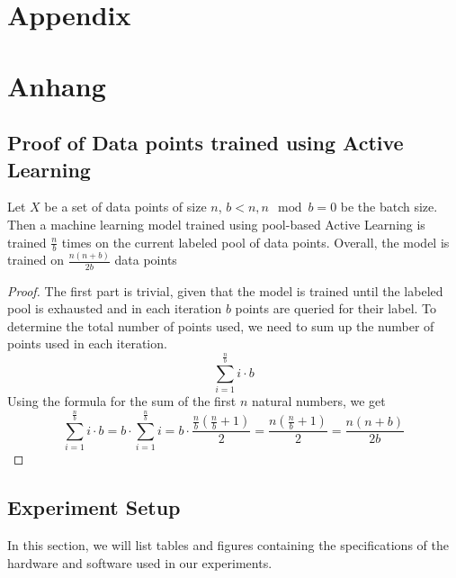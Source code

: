 
{\chapter{Appendix}}    %
{\chapter{Anhang}}      %
\label{chap:appendix}


\section{Proof of Data points trained using Active Learning}
\label{sec:appendix:FirstSection}
\begin{theorem}
Let $X$ be a set of data points of size $n$, $b < n, n \mod b = 0$ be the batch size. Then a machine learning model trained
using pool-based Active Learning is trained $\frac{n}{b}$ times on the current labeled pool of data points. Overall, the model
is trained on $\frac{n(n+b)}{2b}$ data points
\end{theorem}
\begin{proof}
    The first part is trivial, given that the model is trained until the labeled pool is exhausted and in each iteration $b$
    points are queried for their label. To determine the total number of points used, we need to sum up the number of points
    used in each iteration. 
    \begin{equation}
        \sum_{i=1}^{\frac{n}{b}} i \cdot b
    \end{equation}
    Using the formula for the sum of the first $n$ natural numbers, we get
    \begin{equation}
        \sum_{i=1}^{\frac{n}{b}} i \cdot b = b \cdot \sum_{i=1}^{\frac{n}{b}} i = b \cdot \frac{\frac{n}{b} (\frac{n}{b} + 1)}{2}
        = \frac{n (\frac{n}{b} + 1)}{2} = \frac{n(n+b)}{2b}
    \end{equation}
\end{proof}

\section{Experiment Setup}
\label{sec:Appendix:Setup}
In this section, we will list tables and figures containing the specifications of the hardware and software used in our experiments.

